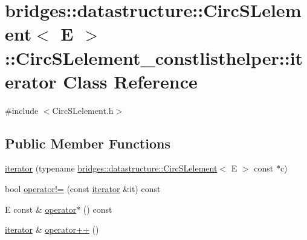\hypertarget{classbridges_1_1datastructure_1_1_circ_s_lelement_1_1_circ_s_lelement__constlisthelper_1_1iterator}{}\section{bridges\+:\+:datastructure\+:\+:Circ\+S\+Lelement$<$ E $>$\+:\+:Circ\+S\+Lelement\+\_\+constlisthelper\+:\+:iterator Class Reference}
\label{classbridges_1_1datastructure_1_1_circ_s_lelement_1_1_circ_s_lelement__constlisthelper_1_1iterator}


{\ttfamily \#include $<$Circ\+S\+Lelement.\+h$>$}

\subsection*{Public Member Functions}
\begin{DoxyCompactItemize}
\item 
\hyperlink{classbridges_1_1datastructure_1_1_circ_s_lelement_1_1_circ_s_lelement__constlisthelper_1_1iterator_ad0917724b0e8cfc656ee5356e2ba6d0f}{iterator} (typename \hyperlink{classbridges_1_1datastructure_1_1_circ_s_lelement}{bridges\+::datastructure\+::\+Circ\+S\+Lelement}$<$ E $>$ const $\ast$c)
\item 
bool \hyperlink{classbridges_1_1datastructure_1_1_circ_s_lelement_1_1_circ_s_lelement__constlisthelper_1_1iterator_a37504466e4920f0e0d54d841cb2e4f0e}{operator!=} (const \hyperlink{classbridges_1_1datastructure_1_1_circ_s_lelement_1_1_circ_s_lelement__constlisthelper_1_1iterator}{iterator} \&it) const
\item 
E const  \& \hyperlink{classbridges_1_1datastructure_1_1_circ_s_lelement_1_1_circ_s_lelement__constlisthelper_1_1iterator_a64318dad58a72d773bfc28495995da0a}{operator$\ast$} () const
\item 
\hyperlink{classbridges_1_1datastructure_1_1_circ_s_lelement_1_1_circ_s_lelement__constlisthelper_1_1iterator}{iterator} \& \hyperlink{classbridges_1_1datastructure_1_1_circ_s_lelement_1_1_circ_s_lelement__constlisthelper_1_1iterator_a12fbdf432dd7ac204138f63c12380e99}{operator++} ()
\end{DoxyCompactItemize}


